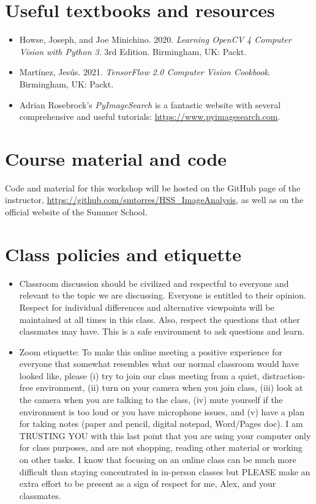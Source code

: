 \documentclass[11pt]{article}
\begin{document}
\begin{flushleft}
\section{Useful textbooks and resources}\label{required-texts-and-materials}
\begin{itemize}
    \item Howse, Joseph, and Joe Minichino. 2020. \emph{Learning OpenCV 4 Computer Vision with Python 3}. 3rd Edition. Birmingham, UK: Packt.
    \item Mart\'{i}nez, Jes\'{u}s. 2021. \emph{TensorFlow 2.0 Computer Vision Cookbook}. Birmingham, UK: Packt.
    \item Adrian Rosebrock's \emph{PyImageSearch} is a fantastic website with several comprehensive and useful tutorials: \url{https://www.pyimagesearch.com}.
\end{itemize}


\section{Course material and code}
Code and material for this workshop will be hosted on the GitHub page of the instructor, \url{https://github.com/smtorres/HSS_ImageAnalysis}, as well as on the official website of the Summer School.


\section{Class policies and etiquette}
\begin{itemize}
    \item Classroom discussion should be civilized and respectful to everyone and relevant to the topic we are discussing. Everyone is entitled to their opinion. Respect for individual differences and alternative viewpoints will be maintained at all times in this class. Also, respect the questions that other classmates may have. This is a safe environment to ask questions and learn.

    \item Zoom etiquette: To make this online meeting a positive experience for everyone that somewhat resembles what our normal classroom would have looked like, please (i) try to join our class meeting from a quiet, distraction-free environment, (ii) turn on your camera when you join class, (iii) look at the camera when you are talking to the class, (iv) mute yourself if the environment is too loud or you have microphone issues, and (v) have a plan for taking notes (paper and pencil, digital notepad, Word/Pages doc). I am TRUSTING YOU with this last point that you are using your computer only for class purposes, and are not shopping, reading other material or working on other tasks. I know that focusing on an online class can be much more difficult than staying concentrated in in-person classes but PLEASE make an extra effort to be present as a sign of respect for me, Alex, and your classmates.
\end{itemize}


\end{flushleft}
\end{document}
